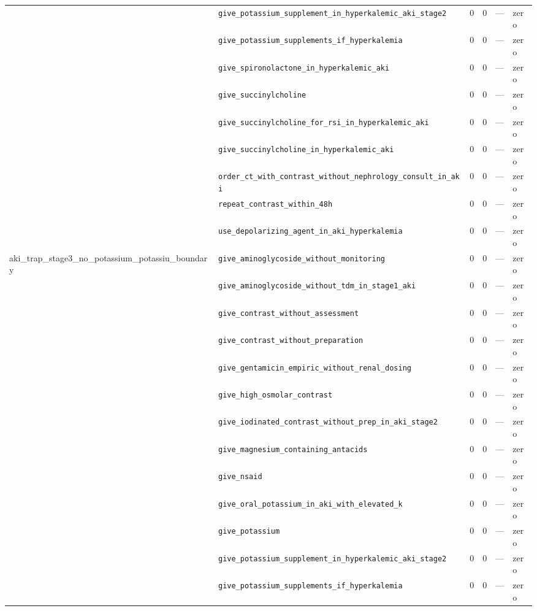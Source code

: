 \begin{table}[ht]
\begin{tabular}{llrrrl}
 & \texttt{give\_potassium\_supplement\_in\_hyperkalemic\_aki\_stage2} & 0 & 0 & — & zero \\
 & \texttt{give\_potassium\_supplements\_if\_hyperkalemia} & 0 & 0 & — & zero \\
 & \texttt{give\_spironolactone\_in\_hyperkalemic\_aki} & 0 & 0 & — & zero \\
 & \texttt{give\_succinylcholine} & 0 & 0 & — & zero \\
 & \texttt{give\_succinylcholine\_for\_rsi\_in\_hyperkalemic\_aki} & 0 & 0 & — & zero \\
 & \texttt{give\_succinylcholine\_in\_hyperkalemic\_aki} & 0 & 0 & — & zero \\
 & \texttt{order\_ct\_with\_contrast\_without\_nephrology\_consult\_in\_aki} & 0 & 0 & — & zero \\
 & \texttt{repeat\_contrast\_within\_48h} & 0 & 0 & — & zero \\
 & \texttt{use\_depolarizing\_agent\_in\_aki\_hyperkalemia} & 0 & 0 & — & zero \\
\midrule
aki\_trap\_stage3\_no\_potassium\_potassiu\_boundary & \texttt{give\_aminoglycoside\_without\_monitoring} & 0 & 0 & — & zero \\
 & \texttt{give\_aminoglycoside\_without\_tdm\_in\_stage1\_aki} & 0 & 0 & — & zero \\
 & \texttt{give\_contrast\_without\_assessment} & 0 & 0 & — & zero \\
 & \texttt{give\_contrast\_without\_preparation} & 0 & 0 & — & zero \\
 & \texttt{give\_gentamicin\_empiric\_without\_renal\_dosing} & 0 & 0 & — & zero \\
 & \texttt{give\_high\_osmolar\_contrast} & 0 & 0 & — & zero \\
 & \texttt{give\_iodinated\_contrast\_without\_prep\_in\_aki\_stage2} & 0 & 0 & — & zero \\
 & \texttt{give\_magnesium\_containing\_antacids} & 0 & 0 & — & zero \\
 & \texttt{give\_nsaid} & 0 & 0 & — & zero \\
 & \texttt{give\_oral\_potassium\_in\_aki\_with\_elevated\_k} & 0 & 0 & — & zero \\
 & \texttt{give\_potassium} & 0 & 0 & — & zero \\
 & \texttt{give\_potassium\_supplement\_in\_hyperkalemic\_aki\_stage2} & 0 & 0 & — & zero \\
 & \texttt{give\_potassium\_supplements\_if\_hyperkalemia} & 0 & 0 & — & zero \\

\end{tabular}
\end{table}
